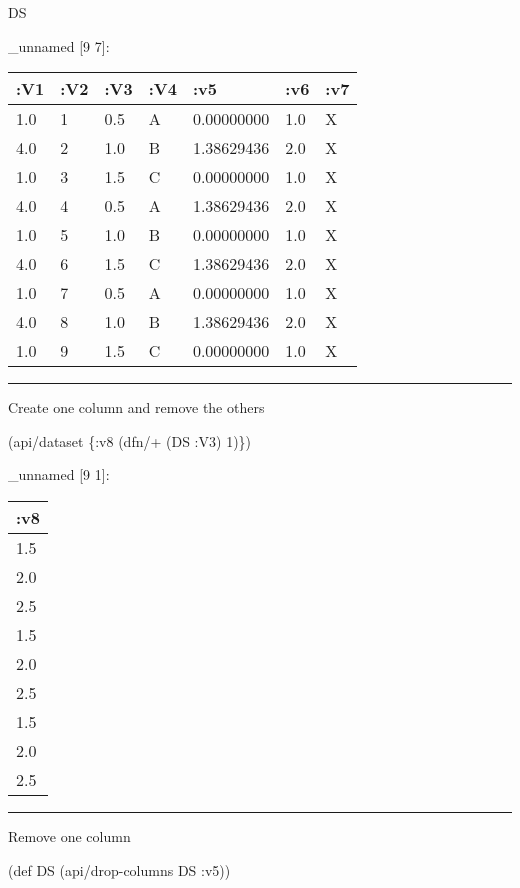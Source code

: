 \documentclass[]{article}
\newenvironment{Shaded}{\begin{snugshade}}{\end{snugshade}}
\newcommand{\AttributeTok}[1]{\textcolor[rgb]{0.77,0.63,0.00}{#1}}
\newcommand{\BuiltInTok}[1]{#1}
\newcommand{\DecValTok}[1]{\textcolor[rgb]{0.00,0.00,0.81}{#1}}
\newcommand{\FunctionTok}[1]{\textcolor[rgb]{0.00,0.00,0.00}{#1}}
\newcommand{\NormalTok}[1]{#1}
\begin{document}
\begin{Shaded}
\begin{Highlighting}[]
\NormalTok{DS}
\end{Highlighting}
\end{Shaded}

\_unnamed {[}9 7{]}:

\begin{longtable}[]{@{}lllllll@{}}
\toprule
:V1 & :V2 & :V3 & :V4 & :v5 & :v6 & :v7\tabularnewline
\midrule
\endhead
1.0 & 1 & 0.5 & A & 0.00000000 & 1.0 & X\tabularnewline
4.0 & 2 & 1.0 & B & 1.38629436 & 2.0 & X\tabularnewline
1.0 & 3 & 1.5 & C & 0.00000000 & 1.0 & X\tabularnewline
4.0 & 4 & 0.5 & A & 1.38629436 & 2.0 & X\tabularnewline
1.0 & 5 & 1.0 & B & 0.00000000 & 1.0 & X\tabularnewline
4.0 & 6 & 1.5 & C & 1.38629436 & 2.0 & X\tabularnewline
1.0 & 7 & 0.5 & A & 0.00000000 & 1.0 & X\tabularnewline
4.0 & 8 & 1.0 & B & 1.38629436 & 2.0 & X\tabularnewline
1.0 & 9 & 1.5 & C & 0.00000000 & 1.0 & X\tabularnewline
\bottomrule
\end{longtable}

\begin{center}\rule{0.5\linewidth}{0.5pt}\end{center}

Create one column and remove the others

\begin{Shaded}
\begin{Highlighting}[]
\NormalTok{(api/dataset \{}\AttributeTok{:v8}\NormalTok{ (dfn/+ (DS }\AttributeTok{:V3}\NormalTok{) }\DecValTok{1}\NormalTok{)\})}
\end{Highlighting}
\end{Shaded}

\_unnamed {[}9 1{]}:

\begin{longtable}[]{@{}l@{}}
\toprule
:v8\tabularnewline
\midrule
\endhead
1.5\tabularnewline
2.0\tabularnewline
2.5\tabularnewline
1.5\tabularnewline
2.0\tabularnewline
2.5\tabularnewline
1.5\tabularnewline
2.0\tabularnewline
2.5\tabularnewline
\bottomrule
\end{longtable}

\begin{center}\rule{0.5\linewidth}{0.5pt}\end{center}

Remove one column

\begin{Shaded}
\begin{Highlighting}[]
\NormalTok{(}\BuiltInTok{def}\FunctionTok{ DS }\NormalTok{(api/drop-columns DS }\AttributeTok{:v5}\NormalTok{))}
\end{Highlighting}
\end{Shaded}
\end{document}
